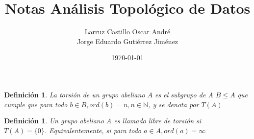 \documentclass[12pt]{book}
\author{Larruz Castillo Oscar André\\
	Jorge Eduardo Gutiérrez Jiménez}
\title{Notas Análisis Topológico de Datos}
\date{\today}
\newtheorem{definition}[theorem]{Definición}
\begin{document}
\frontmatter
\maketitle

\begin{definition}
	La torsión de un grupo abeliano $A$ es el subgrupo de A $B \leq A$ que cumple que para todo $b \in B, ord(b)=n, n \in \mathbb{N}$, y se denota por
	$T(A)$
\end{definition}

\begin{definition}
	Un grupo abeliano A es llamado libre de torsión si\\ $T(A) = \{0\}$. Equivalentemente, si para todo $a \in A, ord (a)= \infty$
\end{definition}
\end{document}
